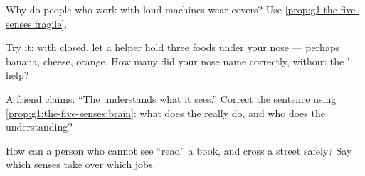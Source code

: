 \begin{exercise}[$\star$]\label{exo:g1:the-five-senses:7}
Why do people who work with loud machines wear  covers? Use
\cref{prop:g1:the-five-senses:fragile}.
\end{exercise}

\begin{exercise}[$\star$]\label{exo:g1:the-five-senses:8}
Try it: with  closed, let a helper hold three foods under your
nose --- perhaps banana, cheese, orange. How many did your nose
name correctly, without the ' help?
\end{exercise}

\begin{exercise}[$\star\star$]\label{exo:g1:the-five-senses:9}
A friend claims: ``The  understands what it sees.'' Correct the
sentence using \cref{prop:g1:the-five-senses:brain}: what does the
 really do, and who does the understanding?
\end{exercise}

\begin{exercise}[$\star\star$]\label{exo:g1:the-five-senses:10}
How can a person who cannot see ``read'' a book, and cross a
street safely? Say which senses take over which jobs.
\end{exercise}
